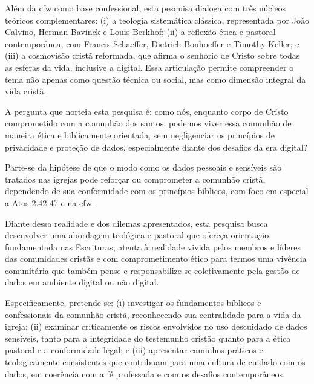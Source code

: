 Além da \gls{cfw} como base confessional, esta pesquisa dialoga com três núcleos teóricos complementares: (i) a teologia sistemática clássica, representada por João Calvino, Herman Bavinck e Louis Berkhof; (ii) a reflexão ética e pastoral contemporânea, com Francis Schaeffer, Dietrich Bonhoeffer e Timothy Keller; e (iii) a cosmovisão cristã reformada, que afirma o senhorio de Cristo sobre todas as esferas da vida, inclusive a digital. Essa articulação permite compreender o tema não apenas como questão técnica ou social, mas como dimensão integral da vida cristã.

A pergunta que norteia esta pesquisa é: como nós, enquanto corpo de Cristo comprometido com a comunhão dos santos, podemos viver essa comunhão de maneira ética e biblicamente orientada, sem negligenciar os princípios de privacidade e proteção de dados, especialmente diante dos desafios da era digital?

Parte-se da hipótese de que o modo como os dados pessoais e sensíveis são tratados nas igrejas pode reforçar ou comprometer a comunhão cristã, dependendo de sua conformidade com os princípios bíblicos, com foco em especial a Atos 2.42-47 e na \gls{cfw}.

Diante dessa realidade e dos dilemas apresentados, esta pesquisa busca desenvolver uma abordagem teológica e pastoral que ofereça orientação fundamentada nas Escrituras, atenta à realidade vivida pelos membros e líderes das comunidades cristãs e com comprometimento ético para termos uma vivência comunitária que também pense e responsabilize-se coletivamente pela gestão de dados em ambiente digital ou não digital.

Especificamente, pretende-se: (i) investigar os fundamentos bíblicos e confessionais da comunhão cristã, reconhecendo sua centralidade para a vida da igreja; (ii) examinar criticamente os riscos envolvidos no uso descuidado de dados sensíveis, tanto para a integridade do testemunho cristão quanto para a ética pastoral e a conformidade legal; e (iii) apresentar caminhos práticos e teologicamente consistentes que contribuam para uma cultura de cuidado com os dados, em coerência com a fé professada e com os desafios contemporâneos.

